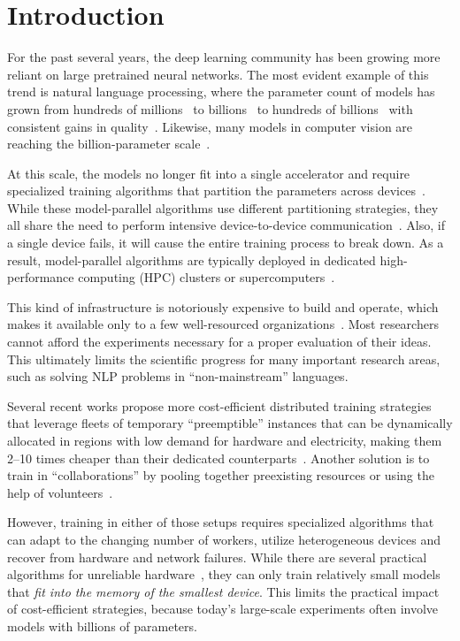 \section{Introduction}
\label{sect:intro}

For the past several years, the deep learning community has been growing more reliant on large pretrained neural networks. The most evident example of this trend is natural language processing, where the parameter count of models has grown from hundreds of millions~\citep{transformer,gpt,bert} to billions~\citep{megatron2,t5,gptj,ernie3} to hundreds of billions~\citep{gpt3,fedus2021switch,palm,gopher} with consistent gains in quality~\citep{kaplan2020scaling}. Likewise, many models in computer vision are reaching the billion-parameter scale~\citep{dalle,scaling_vit,coatnet,guided_diffusion}.

At this scale, the models no longer fit into a single accelerator and require specialized training algorithms that partition the parameters across devices~\citep{alexnet,dean12}. While these model-parallel algorithms use different partitioning strategies, they all share the need to perform intensive device-to-device communication~\citep{pipedream,megatron2}. Also, if a single device fails, it will cause the entire training process to break down. As a result, model-parallel algorithms are typically deployed in dedicated high-performance computing (HPC) clusters or supercomputers~\citep{shoeybi2019megatron,zero,megatron2}.

This kind of infrastructure is notoriously expensive to build and operate, which makes it available only to a few well-resourced organizations~\citep{summit,fugaku,microsoft_supercomputer}. Most researchers cannot afford the experiments necessary for a proper evaluation of their ideas. This ultimately limits the scientific progress for many important research areas, such as solving NLP problems in ``non-mainstream'' languages.

Several recent works propose more cost-efficient distributed training strategies that leverage fleets of temporary ``preemptible'' instances that can be dynamically allocated in regions with low demand for hardware and electricity, making them 2--10 times cheaper than their dedicated counterparts~\citep{proteus}. Another solution is to train in ``collaborations'' by pooling together preexisting resources or using the help of volunteers~\citep{dedloc,eydle,hivemind_dmoe,yuan2022decentralized}. 

However, training in either of those setups requires specialized algorithms that can adapt to the changing number of workers, utilize heterogeneous devices and recover from hardware and network failures. While there are several practical algorithms for unreliable hardware~\citep{volunteer_dl_async,lin2020multinode,moshpit}, they can only train relatively small models that \textit{fit into the memory of the smallest device}. This limits the practical impact of cost-efficient strategies, because today's large-scale experiments often involve models with billions of parameters.%




